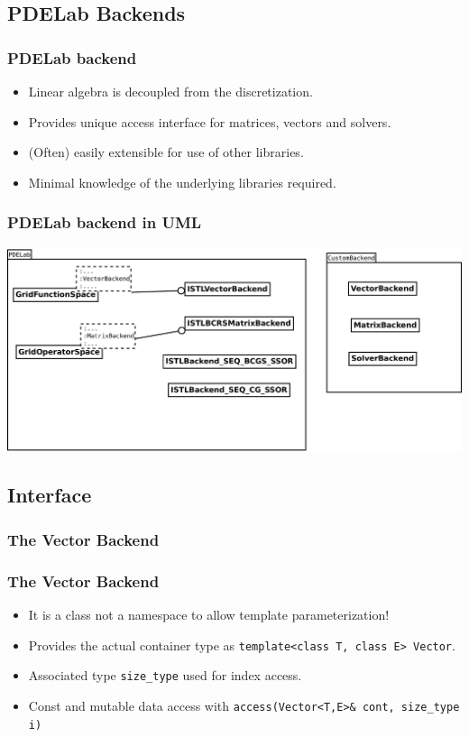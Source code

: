 \subsection{PDELab Backends}
\label{sec:pdelab-backends-1}


\begin{frame}
  \frametitle<presentation>{PDELab backend}
  \begin{itemize}
  \item Linear algebra is decoupled from the discretization.
  \item Provides unique access interface for matrices, vectors and
    solvers.
  \item (Often) easily extensible for use of other libraries.
  \item Minimal knowledge of the underlying libraries required.
  \end{itemize}
\end{frame}

\begin{frame}
  \frametitle{PDELab backend in UML}
  \includegraphics[width=\textwidth]{./EPS/backend}
\end{frame}
\subsection{Interface}
\label{sec:interface}

\subsubsection{The Vector Backend}
\label{sec:vector-backend}

\begin{frame}
  \frametitle<presentation>{The Vector Backend}
  \begin{itemize}
  \item It is a class not a namespace to allow template parameterization!
  \item Provides the actual container type as
    \lstinline!template<class T, class E> Vector!.
  \item Associated type \lstinline!size_type! used for index access.
  \item Const and mutable data access with 
    \lstinline!access(Vector<T,E>& cont, size_type i)!
  \end{itemize}
\end{frame}

